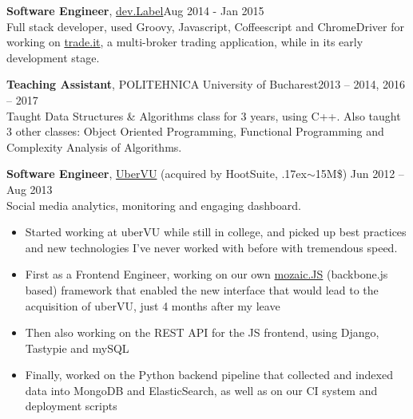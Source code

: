 \documentclass[line, margin]{resume}
\newcommand{\bettertilde}{\raise.17ex\hbox{$\scriptstyle\mathtt{\sim}$}}
\begin{document}
\begin{resume}
\textbf{Software Engineer}, \href{http://devlabel.com/}{dev.Label}\hfill Aug 2014 - Jan 2015\\
Full stack developer, used Groovy, Javascript, Coffeescript and ChromeDriver for working on \href{https://www.trade.it/}{trade.it}, a multi-broker trading application, while in its early development stage.

\textbf{Teaching Assistant}, POLITEHNICA University of Bucharest\hfill 2013 -- 2014, 2016 -- 2017\\
Taught Data Structures \& Algorithms class for 3 years, using C++. Also taught 3 other classes: Object Oriented Programming, Functional Programming and Complexity Analysis of Algorithms.

\textbf{Software Engineer}, \href{http://ubervu.com}{UberVU} (acquired by HootSuite, \bettertilde15M\$) \hfill Jun 2012 -- Aug 2013\\
Social media analytics, monitoring and engaging dashboard.
\begin{itemize} \itemsep -2pt  %
	\item Started working at uberVU while still in college, and picked up best practices and new technologies I've never worked with before with tremendous speed.
	\item First as a Frontend Engineer, working on our own \href{https://github.com/uberVU/mozaic/}{mozaic.JS} (backbone.js based) framework that enabled the new interface that would lead to the acquisition of uberVU, just 4 months after my leave
    \item Then also working on the REST API for the JS frontend, using Django, Tastypie and mySQL
    \item Finally, worked on the Python backend pipeline that collected and indexed data into MongoDB and ElasticSearch, as well as on our CI system and deployment scripts
\end{itemize}




\end{resume}
\end{document}
